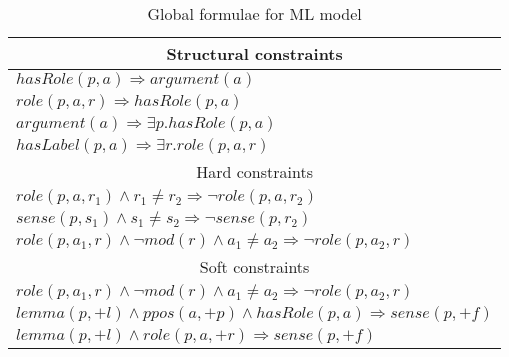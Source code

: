 \begin{table}[ht]
    \centering
    \small
    \begin{tabular}{|p{7.0cm}|}\hline
        \multicolumn{1}{|c|}{Structural constraints}\\\hline
       $hasRole(p,a) \Rightarrow argument(a)$\\
       $role(p,a,r) \Rightarrow hasRole(p,a)$\\\hline
       $argument(a)  \Rightarrow\exists p.hasRole(p,a)$\\
       $hasLabel(p,a) \Rightarrow\exists r. role(p,a,r)$\\\hline
       \multicolumn{1}{|c|}{Hard constraints}\\\hline
       $role(p,a,r_1) \wedge r_1 \neq r_2 \Rightarrow \neg role(p,a,r_2)$\\
       $sense(p,s_1) \wedge s_1 \neq s_2 \Rightarrow \neg sense(p,r_2) $\\
       $role\left(p,a_{1},r\right)\wedge \neg mod\left(r\right)\wedge a_{1}\neq 
       a_{2}  \Rightarrow \neg role\left(p,a_{2},r\right) $ \\\hline
       \multicolumn{1}{|c|}{Soft constraints}\\\hline
       $role\left(p,a_{1},r\right)\wedge \neg mod\left(r\right)\wedge a_{1}\neq 
       a_{2}  \Rightarrow \neg role\left(p,a_{2},r\right) $ \\
       $ lemma(p,+l) \wedge ppos(a,+p) \wedge hasRole(p,a)  \Rightarrow 
       sense(p,+f) $ \\
       $ lemma(p,+l) \wedge role(p,a,+r) \Rightarrow sense(p,+f) $ \\
        \hline
    \end{tabular}
    \caption{Global formulae for ML model}
    \label{tbl:global}
\end{table}

